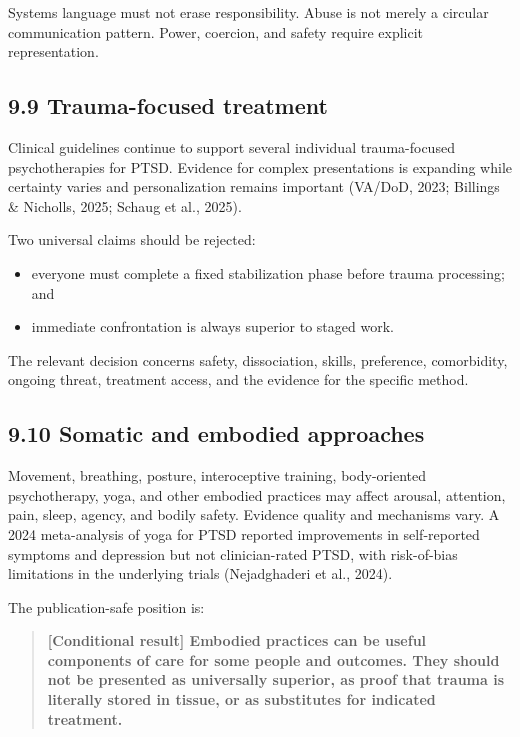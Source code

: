 \documentclass[
  11pt,
]{article}
\providecommand{\tightlist}{%
  \setlength{\itemsep}{0pt}\setlength{\parskip}{0pt}}
\begin{document}
Systems language must not erase responsibility. Abuse is not merely a
circular communication pattern. Power, coercion, and safety require
explicit representation.

\subsection{9.9 Trauma-focused
treatment}\label{trauma-focused-treatment}

Clinical guidelines continue to support several individual
trauma-focused psychotherapies for PTSD. Evidence for complex
presentations is expanding while certainty varies and personalization
remains important (VA/DoD, 2023; Billings \& Nicholls, 2025; Schaug et
al., 2025).

Two universal claims should be rejected:

\begin{itemize}
\tightlist
\item
  everyone must complete a fixed stabilization phase before trauma
  processing; and
\item
  immediate confrontation is always superior to staged work.
\end{itemize}

The relevant decision concerns safety, dissociation, skills, preference,
comorbidity, ongoing threat, treatment access, and the evidence for the
specific method.

\subsection{9.10 Somatic and embodied
approaches}\label{somatic-and-embodied-approaches}

Movement, breathing, posture, interoceptive training, body-oriented
psychotherapy, yoga, and other embodied practices may affect arousal,
attention, pain, sleep, agency, and bodily safety. Evidence quality and
mechanisms vary. A 2024 meta-analysis of yoga for PTSD reported
improvements in self-reported symptoms and depression but not
clinician-rated PTSD, with risk-of-bias limitations in the underlying
trials (Nejadghaderi et al., 2024).

The publication-safe position is:

\begin{quote}
\textbf{{[}Conditional result{]} Embodied practices can be useful
components of care for some people and outcomes. They should not be
presented as universally superior, as proof that trauma is literally
stored in tissue, or as substitutes for indicated treatment.}
\end{quote}
\end{document}

